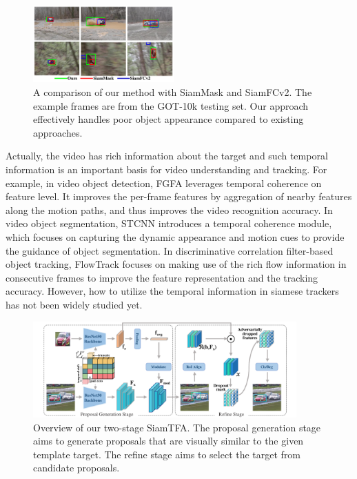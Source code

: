 \begin{figure}[t]
    \centering
    \includegraphics[width=0.48\textwidth]{Img/end/visulization.pdf}
    \vspace{-0.8cm}
    \caption{A comparison of our method with SiamMask and SiamFCv2. The example frames are from the GOT-10k testing set. Our approach effectively handles poor object appearance compared to existing approaches.}
    \vspace{-0.5cm}
    \label{fig:visulization}
\end{figure}

Actually, the video has rich information about the target and such temporal information is an important basis for video understanding and tracking.
For example, in video object detection, FGFA \cite{zhu2017flow} leverages temporal coherence on feature level. It improves the per-frame features by aggregation of nearby features along the motion paths, and thus improves the video recognition accuracy.
In video object segmentation, STCNN \cite{xu2019spatiotemporal} introduces a temporal coherence module, which focuses on capturing the dynamic appearance and motion cues to provide the guidance of object segmentation.
In discriminative correlation filter-based object tracking, FlowTrack \cite{zhu2018end} focuses on making use of the rich flow information in consecutive frames to improve the feature representation and the tracking accuracy. 
However, how to utilize the temporal information in siamese trackers has not been widely studied yet. 

\begin{figure}[t]
    \centering
    \includegraphics[width=0.9\textwidth]{Img/end/net_v3.pdf}
    \vspace{-0.5cm}
    \caption{
    Overview of our two-stage SiamTFA.
    The proposal generation stage aims to generate proposals that are visually similar to the given template target. The refine stage aims to select the target from candidate proposals.}
    \label{fig:SiamTFA}
\end{figure}

